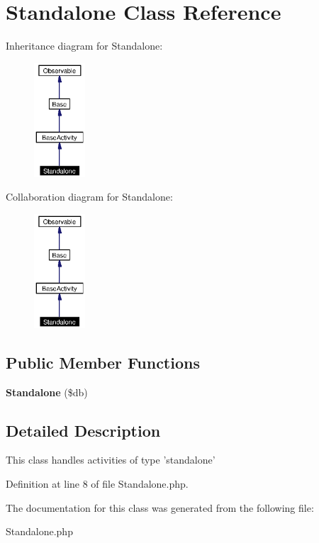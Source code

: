 \section{Standalone Class Reference}
\label{classStandalone}
Inheritance diagram for Standalone:\begin{figure}[H]
\begin{center}
\leavevmode
\includegraphics[width=54pt]{classStandalone__inherit__graph}
\end{center}
\end{figure}
Collaboration diagram for Standalone:\begin{figure}[H]
\begin{center}
\leavevmode
\includegraphics[width=54pt]{classStandalone__coll__graph}
\end{center}
\end{figure}
\subsection*{Public Member Functions}
\begin{CompactItemize}
\item 
{\bf Standalone} (\$db)\label{classStandalone_a0}

\end{CompactItemize}


\subsection{Detailed Description}
This class handles activities of type 'standalone' 



Definition at line 8 of file Standalone.php.

The documentation for this class was generated from the following file:\begin{CompactItemize}
\item 
Standalone.php\end{CompactItemize}
